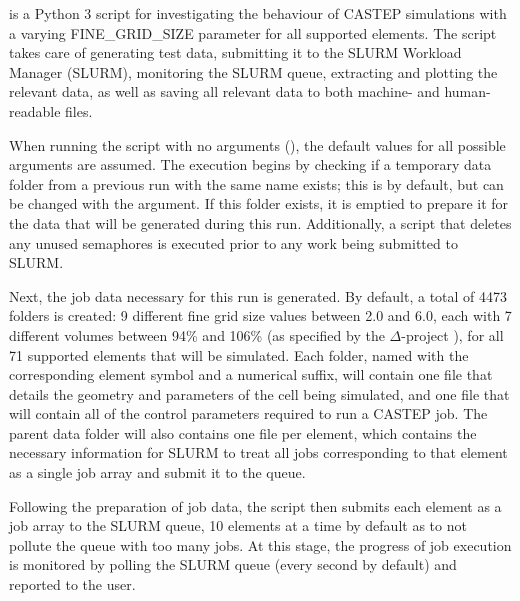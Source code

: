  is a Python 3 script for investigating the behaviour of CASTEP simulations with a varying FINE\_GRID\_SIZE parameter for all supported elements. The script takes care of generating test data, submitting it to the SLURM Workload Manager (SLURM), monitoring the SLURM queue, extracting and plotting the relevant data, as well as saving all relevant data to both machine- and human-readable files.

When running the script with no arguments (), the default values for all possible arguments are assumed. The execution begins by checking if a temporary data folder from a previous run with the same name exists; this is  by default, but can be changed with the  argument. If this folder exists, it is emptied to prepare it for the data that will be generated during this run. Additionally, a script that deletes any unused semaphores is executed prior to any work being submitted to SLURM.

Next, the job data necessary for this run is generated. By default, a total of 4473 folders is created: 9 different fine grid size values between 2.0 and 6.0, each with 7 different volumes between 94\% and 106\% (as specified by the $\Delta$-project \cite{delta}), for all 71 supported elements that will be simulated. Each folder, named with the corresponding element symbol and a numerical suffix, will contain one  file that details the geometry and parameters of the cell being simulated, and one  file that will contain all of the control parameters required to run a CASTEP job. The parent data folder will also contains one  file per element, which contains the necessary information for SLURM to treat all jobs corresponding to that element as a single job array and submit it to the queue.

Following the preparation of job data, the script then submits each element as a job array to the SLURM queue, 10 elements at a time by default as to not pollute the queue with too many jobs. At this stage, the progress of job execution is monitored by polling the SLURM queue (every second by default) and reported to the user.

